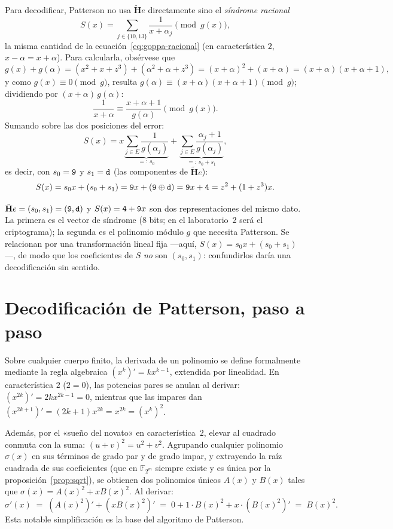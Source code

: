 \documentclass[11pt,a4paper,oneside]{report}
\newcommand{\GF}[1]{\mathbb{F}_{#1}}
\newcommand{\Hmat}{\mathbf{H}}          %
\newcommand{\hx}[1]{\text{\texttt{#1}}}
\begin{document}
Para decodificar, Patterson no usa $\tilde{\Hmat} e$ directamente sino el
\emph{síndrome racional}
\[
S(x)=\sum_{j\in\{10,13\}}\frac{1}{x+\alpha_j}\pmod{g(x)},
\]
la misma cantidad de la ecuación~\eqref{eq:goppa-racional} (en
característica $2$, $x-\alpha=x+\alpha$). Para calcularla, obsérvese que
\[
g(x)+g(\alpha)=(x^2+x+z^3)+(\alpha^2+\alpha+z^3)
=(x+\alpha)^2+(x+\alpha)=(x+\alpha)(x+\alpha+1),
\]
y como $g(x)\equiv0\pmod g$, resulta
$g(\alpha)\equiv(x+\alpha)(x+\alpha+1)\pmod g$; dividiendo por
$(x+\alpha)\,g(\alpha)$:
\begin{equation}
\frac{1}{x+\alpha}\equiv\frac{x+\alpha+1}{g(\alpha)}\pmod{g(x)}.
\label{eq:lab-inversa}
\end{equation}
Sumando sobre las dos posiciones del error:
\[
S(x)=x\underbrace{\sum_{j\in E}\frac1{g(\alpha_j)}}_{=:\,s_0}
+\underbrace{\sum_{j\in E}\frac{\alpha_j+1}{g(\alpha_j)}}_{=:\,s_0+s_1},
\]
es decir, con $s_0=\hx9$ y $s_1=\hx d$ (las componentes de
$\tilde{\Hmat} e$):
\begin{equation}
S(x)=s_0x+(s_0+s_1)=\hx9x+(\hx9\oplus\hx d)
=\hx9x+\hx4=z^2+(1+z^3)x.
\label{eq:lab-S}
\end{equation}

\begin{trampa}[El síndrome no es $S(x)$]
$\tilde{\Hmat} e=(s_0,s_1)=(\hx9,\hx d)$ y $S(x)=\hx4+\hx9x$ son dos
representaciones del mismo dato. La primera es el vector de síndrome
($8$ bits; en el laboratorio~2 será el criptograma); la segunda es el
polinomio módulo $g$ que necesita Patterson. Se relacionan por una
transformación lineal fija —aquí, $S(x)=s_0x+(s_0+s_1)$—, de modo que
los coeficientes de $S$ \emph{no} son $(s_0,s_1)$: confundirlos daría una
decodificación sin sentido.
\end{trampa}

\section{Decodificación de Patterson, paso a paso}

\begin{idea}
Sobre cualquier cuerpo finito, la derivada de un polinomio se define formalmente
mediante la regla algebraica $(x^k)'=kx^{k-1}$, extendida por linealidad.
En característica $2$ ($2=0$), las potencias pares se anulan al derivar:
$(x^{2k})'=2kx^{2k-1}=0$, mientras que las impares dan $(x^{2k+1})'=(2k+1)x^{2k}=x^{2k}=(x^k)^2$.

Además, por el «sueño del novato» en característica~$2$, elevar al cuadrado conmuta
con la suma: $(u+v)^2=u^2+v^2$. Agrupando cualquier polinomio $\sigma(x)$ en sus términos
de grado par y de grado impar, y extrayendo la raíz cuadrada de sus coeficientes
(que en $\GF{2^m}$ siempre existe y es única por la proposición~\ref{prop:sqrt}),
se obtienen dos polinomios únicos $A(x)$ y $B(x)$ tales que $\sigma(x) = A(x)^2 + x B(x)^2$.
Al derivar:
\[
\sigma'(x) \;=\; (A(x)^2)' + (x B(x)^2)' \;=\; 0 + 1\cdot B(x)^2 + x\cdot (B(x)^2)' \;=\; B(x)^2.
\]
Esta notable simplificación es la base del algoritmo de Patterson.
\end{idea}
\end{document}
